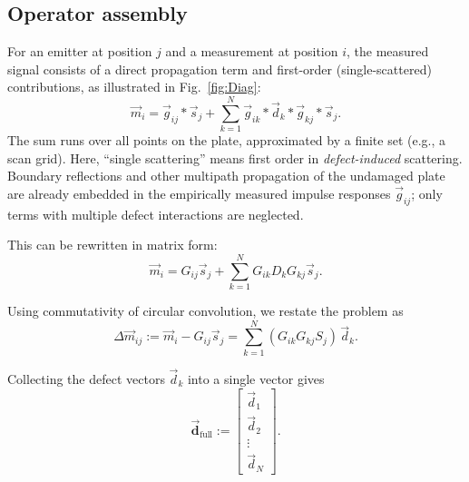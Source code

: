 \documentclass[a4paper,fleqn]{cas-sc}
\begin{document}





\subsection{Operator assembly}\label{Operator assembly}
For an emitter at position $j$ and a measurement at position $i$, the measured signal consists of a direct propagation term and first-order (single-scattered) contributions, as illustrated in Fig.~\ref{fig:Diag}:
\begin{equation}
\vec m_i = \vec{g}_{ij}\ast\vec s_j + \sum_{k=1}^N \vec{g}_{ik} \ast \vec{d}_k \ast\vec{g}_{kj}\ast \vec s_j.
\end{equation}
The sum runs over all points on the plate, approximated by a finite set (e.g., a scan grid). Here, ``single scattering'' means first order in \emph{defect-induced} scattering. Boundary reflections and other multipath propagation of the undamaged plate are already embedded in the empirically measured impulse responses $\vec g_{ij}$; only terms with multiple defect interactions are neglected.

This can be rewritten in matrix form:
\begin{equation}
\vec m_i = G_{ij}\vec s_j + \sum_{k=1}^N G_{ik} D_k G_{kj} \vec s_j.
\end{equation}

Using commutativity of circular convolution, we restate the problem as
\begin{equation}
\Delta \vec m_{ij} := \vec m_i - G_{ij}\vec s_j = \sum_{k=1}^N (G_{ik} G_{kj} S_j)\, \vec{d}_k.
\end{equation}

Collecting the defect vectors $\vec{d}_k$ into a single vector gives
\begin{equation}
\vec{\mathbf{d}}_{\mathrm{full}} := \begin{bmatrix} \vec{d}_1 \\ \vec{d}_2 \\ \vdots \\ \vec{d}_N \end{bmatrix}.
\end{equation}
\end{document}
